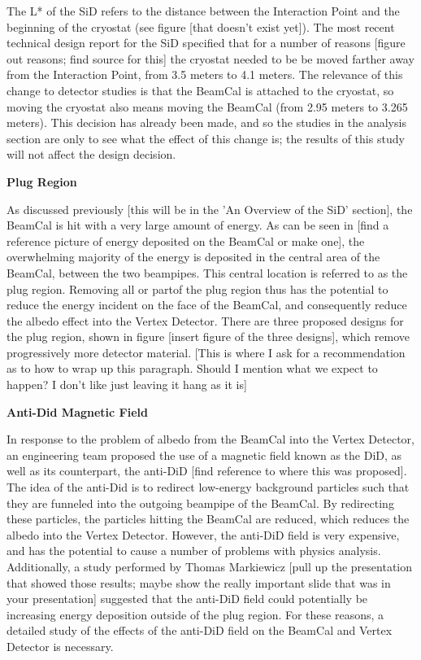 \documentclass{article}
\begin{document}
        The L* of the SiD refers to the distance between the Interaction Point and the beginning of the cryostat (see figure [that doesn't exist yet]). The most recent technical design report for the SiD specified that for a number of reasons [figure out reasons; find source for this] the cryostat needed to be be moved farther away from the Interaction Point, from 3.5 meters to 4.1 meters. The relevance of this change to detector studies is that the BeamCal is attached to the cryostat, so moving the cryostat also means moving the BeamCal (from 2.95 meters to 3.265 meters). This decision has already been made, and so the studies in the analysis section are only to see what the effect of this change is; the results of this study will not affect the design decision.


        \begin{center}
            \bf{Plug Region}
        \end{center}

        As discussed previously [this will be in the 'An Overview of the SiD' section], the BeamCal is hit with a very large amount of energy. As can be seen in [find a reference picture of energy deposited on the BeamCal or make one], the overwhelming majority of the energy is deposited in the central area of the BeamCal, between the two beampipes. This central location is referred to as the plug region. Removing all or partof the plug region thus has the potential to reduce the energy incident on the face of the BeamCal, and consequently reduce the albedo effect into the Vertex Detector. There are three proposed designs for the plug region, shown in figure [insert figure of the three designs], which remove progressively more detector material. [This is where I ask for a recommendation as to how to wrap up this paragraph. Should I mention what we expect to happen? I don't like just leaving it hang as it is]


        \begin{center}
            \bf{Anti-Did Magnetic Field}
        \end{center}

        In response to the problem of albedo from the BeamCal into the Vertex Detector, an engineering team proposed the use of a magnetic field known as the DiD, as well as its counterpart, the anti-DiD [find reference to where this was proposed]. The idea of the anti-Did is to redirect low-energy background particles such that they are funneled into the outgoing beampipe of the BeamCal. By redirecting these particles, the particles hitting the BeamCal are reduced, which reduces the albedo into the Vertex Detector. However, the anti-DiD field is very expensive, and has the potential to cause a number of problems with physics analysis. Additionally, a study performed by Thomas Markiewicz [pull up the presentation that showed those results; maybe show the really important slide that was in your presentation] suggested that the anti-DiD field could potentially be increasing energy deposition outside of the plug region. For these reasons, a detailed study of the effects of the anti-DiD field on the BeamCal and Vertex Detector is necessary.
\end{document}
